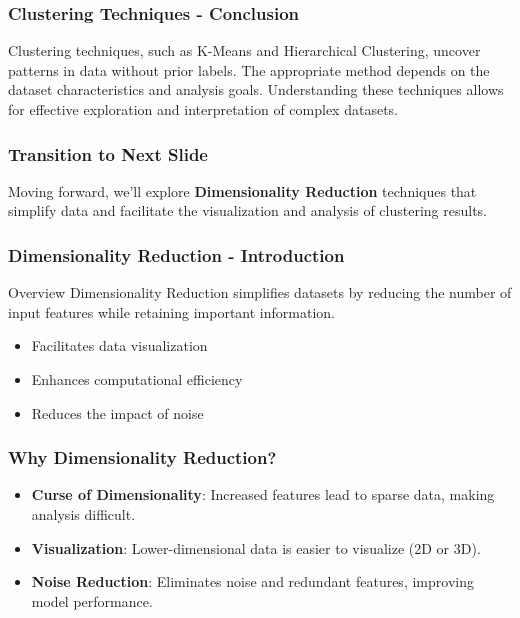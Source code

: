 \documentclass[aspectratio=169]{beamer}
\begin{document}
\begin{frame}[fragile]
    \frametitle{Clustering Techniques - Conclusion}
    Clustering techniques, such as K-Means and Hierarchical Clustering, uncover patterns in data without prior labels. 
    The appropriate method depends on the dataset characteristics and analysis goals. 
    Understanding these techniques allows for effective exploration and interpretation of complex datasets.
\end{frame}

\begin{frame}[fragile]
    \frametitle{Transition to Next Slide}
    Moving forward, we'll explore \textbf{Dimensionality Reduction} techniques that simplify data and facilitate the visualization and analysis of clustering results.
\end{frame}

\begin{frame}[fragile]
    \frametitle{Dimensionality Reduction - Introduction}
    \begin{block}{Overview}
        Dimensionality Reduction simplifies datasets by reducing the number of input features while retaining important information. 
    \end{block}
    \begin{itemize}
        \item Facilitates data visualization
        \item Enhances computational efficiency
        \item Reduces the impact of noise
    \end{itemize}
\end{frame}

\begin{frame}[fragile]
    \frametitle{Why Dimensionality Reduction?}
    \begin{itemize}
        \item \textbf{Curse of Dimensionality}: Increased features lead to sparse data, making analysis difficult.
        \item \textbf{Visualization}: Lower-dimensional data is easier to visualize (2D or 3D).
        \item \textbf{Noise Reduction}: Eliminates noise and redundant features, improving model performance.
    \end{itemize}
\end{frame}
\end{document}
